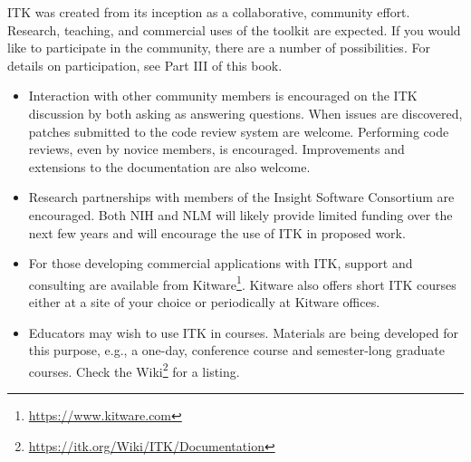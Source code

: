 ITK was created from its inception as a collaborative, community
effort. Research, teaching, and commercial uses of the toolkit are
expected. If you would like to participate in the community, there are a
number of possibilities. For details on participation, see Part III of this book.

\begin{itemize}
       \item Interaction with other community members is encouraged on the ITK
       discussion by both asking as answering questions. When issues are
       discovered, patches submitted to the code review system are welcome.
       Performing code reviews, even by novice members, is encouraged.
       Improvements and extensions to the documentation are also welcome.

       \item Research partnerships with members of the Insight Software
       Consortium are encouraged. Both NIH and NLM will likely provide
       limited funding over the next few years and will encourage the use of
       ITK in proposed work.

       \item For those developing commercial applications with ITK, support
       and consulting are available from Kitware\footnote{\url{https://www.kitware.com}}.
       Kitware also offers short ITK courses either at a site of your choice
       or periodically at Kitware offices.

       \item Educators may wish to use ITK in courses. Materials are being
       developed for this purpose, e.g., a one-day, conference course and
       semester-long graduate courses. Check the
       Wiki\footnote{\url{https://itk.org/Wiki/ITK/Documentation}} for a listing.
\end{itemize}

